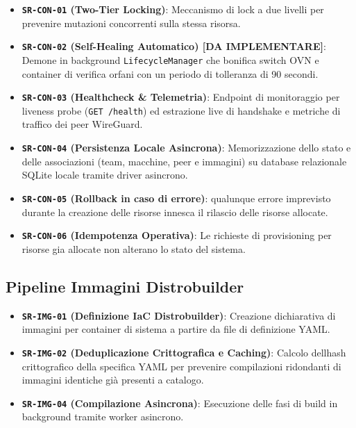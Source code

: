 \begin{itemize}
\tightlist
\item
  \textbf{\passthrough{\lstinline!SR-CON-01!} (Two-Tier Locking)}:
  Meccanismo di lock a due livelli per prevenire mutazioni concorrenti
  sulla stessa risorsa.
\item
  \textbf{\passthrough{\lstinline!SR-CON-02!} (Self-Healing Automatico)
  {[}DA IMPLEMENTARE{]}}: Demone in background
  \passthrough{\lstinline!LifecycleManager!} che bonifica switch OVN e
  container di verifica orfani con un periodo di tolleranza di 90
  secondi.
\item
  \textbf{\passthrough{\lstinline!SR-CON-03!} (Healthcheck \&
  Telemetria)}: Endpoint di monitoraggio per liveness probe
  (\passthrough{\lstinline!GET /health!}) ed estrazione live di
  handshake e metriche di traffico dei peer WireGuard.
\item
  \textbf{\passthrough{\lstinline!SR-CON-04!} (Persistenza Locale
  Asincrona)}: Memorizzazione dello stato e delle associazioni (team,
  macchine, peer e immagini) su database relazionale SQLite locale
  tramite driver asincrono.
\item
  \textbf{\passthrough{\lstinline!SR-CON-05!} (Rollback in caso di
  errore)}: qualunque errore imprevisto durante la creazione delle
  risorse innesca il rilascio delle risorse allocate.
\item
  \textbf{\passthrough{\lstinline!SR-CON-06!} (Idempotenza Operativa)}:
  Le richieste di provisioning per risorse gia allocate non alterano lo
  stato del sistema.
\end{itemize}

\subsection{Pipeline Immagini
Distrobuilder}\label{pipeline-immagini-distrobuilder}

\begin{itemize}
\tightlist
\item
  \textbf{\passthrough{\lstinline!SR-IMG-01!} (Definizione IaC
  Distrobuilder)}: Creazione dichiarativa di immagini per container di
  sistema a partire da file di definizione YAML.
\item
  \textbf{\passthrough{\lstinline!SR-IMG-02!} (Deduplicazione
  Crittografica e Caching)}: Calcolo dell\textquotesingle hash
  crittografico della specifica YAML per prevenire compilazioni
  ridondanti di immagini identiche già presenti a catalogo.
\item
  \textbf{\passthrough{\lstinline!SR-IMG-04!} (Compilazione Asincrona)}:
  Esecuzione delle fasi di build in background tramite worker asincrono.
\end{itemize}
